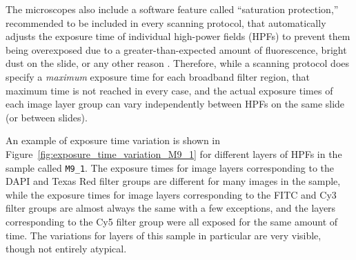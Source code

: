 \documentclass[letterpaper,11pt]{article}
\newcommand{\reffig}[1]{Figure~\ref{#1}}
\begin{document}
The microscopes also include a software feature called ``saturation protection,'' recommended to be included in every scanning protocol, that automatically adjusts the exposure time of individual high-power fields (HPFs) to prevent them being overexposed due to a greater-than-expected amount of fluorescence, bright dust on the slide, or any other reason \cite{vectra_user_manual,polaris_user_manual}. Therefore, while a scanning protocol does specify a \textit{maximum} exposure time for each broadband filter region, that maximum time is not reached in every case, and the actual exposure times of each image layer group can vary independently between HPFs on the same slide (or between slides). 

An example of exposure time variation is shown in \reffig{fig:exposure_time_variation_M9_1} for different layers of HPFs in the sample called \texttt{M9\_1}. The exposure times for image layers corresponding to the DAPI and Texas Red filter groups are different for many images in the sample, while the exposure times for image layers corresponding to the FITC and Cy3 filter groups are almost always the same with a few exceptions, and the layers corresponding to the Cy5 filter group were all exposed for the same amount of time. The variations for layers of this sample in particular are very visible, though not entirely atypical.
\end{document}

